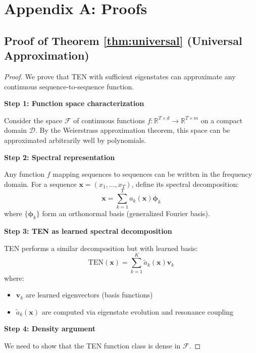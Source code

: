 \documentclass[11pt,letterpaper]{article}
\newcommand{\R}{\mathbb{R}}
\begin{document}
\newpage
\appendix

\section{Appendix A: Proofs}

\subsection{Proof of Theorem \ref{thm:universal} (Universal Approximation)}

\begin{proof}
We prove that TEN with sufficient eigenstates can approximate any continuous sequence-to-sequence function.

\textbf{Step 1: Function space characterization}

Consider the space $\mathcal{F}$ of continuous functions $f: \R^{T \times d} \to \R^{T \times m}$ on a compact domain $\mathcal{D}$. By the Weierstrass approximation theorem, this space can be approximated arbitrarily well by polynomials.

\textbf{Step 2: Spectral representation}

Any function $f$ mapping sequences to sequences can be written in the frequency domain. For a sequence $\mathbf{x} = (x_1, \ldots, x_T)$, define its spectral decomposition:
\begin{equation}
    \mathbf{x} = \sum_{k=1}^{T} a_k(\mathbf{x}) \mathbf{\phi}_k
\end{equation}
where $\{\mathbf{\phi}_k\}$ form an orthonormal basis (generalized Fourier basis).

\textbf{Step 3: TEN as learned spectral decomposition}

TEN performs a similar decomposition but with learned basis:
\begin{equation}
    \text{TEN}(\mathbf{x}) = \sum_{k=1}^{K} \tilde{a}_k(\mathbf{x}) \mathbf{v}_k
\end{equation}
where:
\begin{itemize}
    \item $\mathbf{v}_k$ are learned eigenvectors (basis functions)
    \item $\tilde{a}_k(\mathbf{x})$ are computed via eigenstate evolution and resonance coupling
\end{itemize}

\textbf{Step 4: Density argument}

We need to show that the TEN function class is dense in $\mathcal{F}$.


\end{proof}
\end{document}
